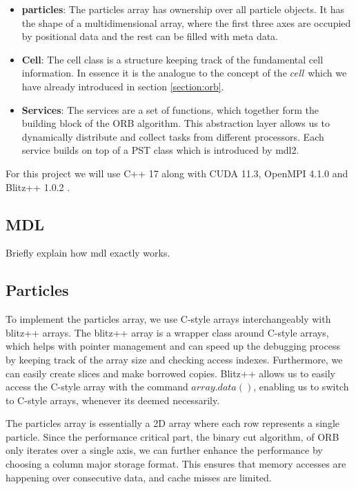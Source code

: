 \documentclass[]{article}
\begin{document}
\begin{itemize}
	\item \textbf{particles}: The particles array has ownership over all particle objects. It has the shape of a multidimensional array, where the first three axes are occupied by positional data and the rest can be filled with meta data.
	\item \textbf{Cell}: The cell class is a structure keeping track of the fundamental cell information. In essence it is the analogue to the concept of the $cell$ which we have already introduced in section \ref{section:orb}.
	\item \textbf{Services}: The services are a set of functions, which together form the building block of the ORB algorithm. This abstraction layer allows us to dynamically distribute and collect tasks from different processors. Each service builds on top of a PST class which is introduced by mdl2.
	
\end{itemize}

For this project we will use C++ 17 along with CUDA 11.3, OpenMPI 4.1.0 and Blitz++ 1.0.2 \cite{blitzcpp}. 

\subsection{MDL}

Briefly explain how mdl exactly works. 

\subsection{Particles}

To implement the particles array, we use C-style arrays interchangeably with blitz++ arrays. The blitz++ array is a wrapper class around C-style arrays, which helps with pointer management and can speed up the debugging process by keeping track of the array size and checking access indexes. Furthermore, we can easily create slices and make borrowed copies. 
Blitz++ allows us to easily access the C-style array with the command $array.data()$, enabling us to switch to C-style arrays, whenever its deemed necessarily. 

The particles array is essentially a 2D array where each row represents a single particle. Since the performance critical part, the binary cut algorithm, of ORB only iterates over a single axis, we can further enhance the performance by choosing a column major storage format. This ensures that memory accesses are happening over consecutive data, and cache misses are limited.
\end{document}
